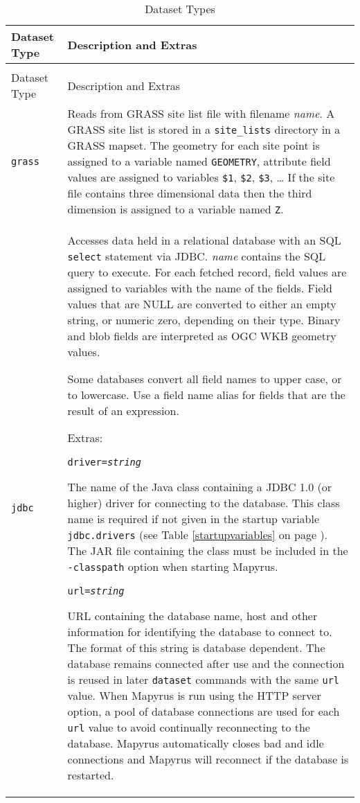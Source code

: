 \begin{longtable}{|p{3cm}|p{10cm}|}
\hline
\label{datasettypes}
Dataset Type & Description and Extras \\
\hline
\hline
\endfirsthead
\hline
\caption{Dataset Types} \\
\endfoot

\hline
Dataset Type & Description and Extras \\
\hline
\hline
\endhead

\texttt{grass} &
Reads from GRASS site list file with filename \textit{name}.
A GRASS site list is stored in a \texttt{site\_lists}
directory in a GRASS mapset.
The geometry for each site point is assigned to a variable named
\texttt{GEOMETRY}, attribute field values are assigned to variables
\texttt{\$1}, \texttt{\$2}, \texttt{\$3}, \dots
If the site file contains three dimensional data then the
third dimension is assigned to a variable named \texttt{Z}.  \\

\hline

\texttt{jdbc} &
Accesses data held in a relational database with
an SQL \texttt{select} statement via JDBC.
\textit{name} contains the SQL query to execute.
For each fetched record, field values are assigned to variables
with the name of the fields.
Field values that are NULL are converted to either an empty string,
or numeric zero, depending on their type.
Binary and blob fields are interpreted as OGC WKB geometry values.

Some databases convert all field names to upper case, or to lowercase.
Use a field name alias for fields that are the result of an expression.

\vspace{10pt}
Extras:

\texttt{driver=\textit{string}}

The name of the Java class containing a JDBC 1.0 (or higher)
driver for connecting to the database.
This class name is required if not given in the startup variable
\texttt{jdbc.drivers} (see Table \ref{startupvariables}
on page \pageref{startupvariables}).
The JAR file containing the class must be included in the \texttt{-classpath}
option when starting Mapyrus.

\vspace{10pt}
\texttt{url=\textit{string}}

URL containing the database name, host and other information for identifying
the database to connect to.
The format of this string is database dependent.
The database remains connected after use and the connection is reused in later
\texttt{dataset} commands with the same \texttt{url} value.
When Mapyrus is run using the HTTP server option, a pool of
database connections are used for each \texttt{url} value to avoid
continually reconnecting to the database.
Mapyrus automatically closes bad and idle connections
and Mapyrus will reconnect if the database is restarted.


\end{longtable}
